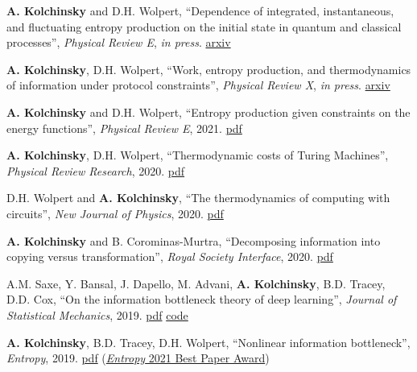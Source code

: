 
\newcommand{\pdflink}[1]{\href{https://artemyk.github.io/assets/pdf/papers/#1.pdf}{pdf}}

\textbf{A. Kolchinsky} and D.H. Wolpert, ``Dependence of integrated, instantaneous, and fluctuating entropy production on the initial state in quantum and classical processes'', \emph{Physical Review E}, \emph{in press}. \href{http://arxiv.org/abs/2103.05734}{arxiv}

\textbf{A. Kolchinsky}, D.H. Wolpert, ``Work, entropy production, and thermodynamics of information under protocol constraints'', \emph{Physical Review X}, \emph{in press}. \href{http://arxiv.org/abs/2008.10764}{arxiv}

\textbf{A. Kolchinsky} and D.H. Wolpert, ``Entropy production given constraints on the energy functions'', \emph{Physical Review E}, 2021. \pdflink{Kolchinsky and Wolpert - 2021 - Entropy production given constraints on the energy functions}

\textbf{A. Kolchinsky}, D.H. Wolpert, ``Thermodynamic costs of Turing Machines'', \emph{Physical Review Research}, 2020. %
\pdflink{Kolchinsky_Wolpert_2020_Thermodynamic costs of Turing machines}

D.H. Wolpert and \textbf{A. Kolchinsky}, ``The thermodynamics of computing with circuits'', \emph{New Journal of Physics}, 2020.  %
\pdflink{Wolpert and Kolchinsky - 2020 - Thermodynamics of computing with circuits}

\textbf{A. Kolchinsky} and B. Corominas-Murtra, ``Decomposing information into copying versus transformation'', 
\emph{Royal Society Interface}, 2020. %
\pdflink{Kolchinsky_Corominas-Murtra_2020_Decomposing information into copying versus transformation}

A.M. Saxe, Y. Bansal, J. Dapello, M. Advani, \textbf{A. Kolchinsky}, B.D. Tracey, D.D. Cox, 
``On the information bottleneck theory of deep learning'',  \emph{Journal of Statistical Mechanics}, 2019. 
\pdflink{Saxe et al_2019_On the information bottleneck theory of deep learning} 
\href{https://github.com/artemyk/ibsgd/tree/iclr2018}{code} %

\textbf{A. Kolchinsky}, B.D. Tracey, D.H. Wolpert, ``Nonlinear information bottleneck'', \emph{Entropy}, 2019.
\pdflink{Kolchinsky et al_2019_Nonlinear information bottleneck} (\href{https://www.mdpi.com/journal/entropy/awards/1209}{{\emph{Entropy} 2021 Best Paper Award}})

